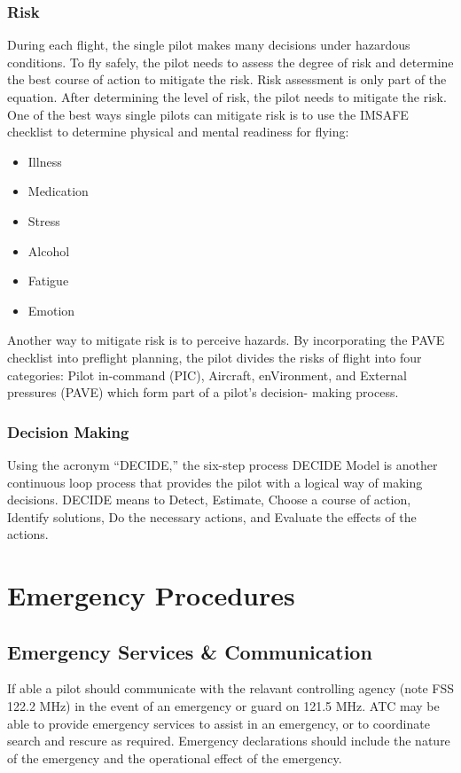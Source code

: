 \documentclass[12pt]{article}
\begin{document}
		\subsubsection{Risk}
			During each flight, the single pilot makes many decisions under hazardous conditions. To fly safely, the pilot needs to assess the degree of risk and determine the best course of action to mitigate the risk. Risk assessment is only part of the equation. After determining the level of risk, the pilot needs to mitigate the risk. One of the best ways single pilots can mitigate risk is to use the IMSAFE checklist to determine physical and mental readiness for flying:
				\begin{itemize}
					\item Illness
					\item Medication
					\item Stress
					\item Alcohol
					\item Fatigue
					\item Emotion
				\end{itemize}
			Another way to mitigate risk is to perceive hazards. By incorporating the PAVE checklist into preflight planning, the pilot divides the risks of flight into four categories: Pilot­ in-command (PIC), Aircraft, enVironment, and External pressures (PAVE) which form part of a pilot’s decision- making process.
		\subsubsection{Decision Making}
			Using the acronym ``DECIDE,'' the six-step process DECIDE Model is another continuous loop process that provides the pilot with a logical way of making decisions. DECIDE means to Detect, Estimate, Choose a course of action, Identify solutions, Do the necessary actions, and Evaluate the effects of the actions.
			
\newpage
\section{Emergency Procedures}
	\subsection{Emergency Services \& Communication}
		If able a pilot should communicate with the relavant controlling agency (note FSS 122.2 MHz) in the event of an emergency or guard on 121.5 MHz. ATC may be able to provide emergency services to assist in an emergency, or to coordinate search and rescure as required. Emergency declarations should include the nature of the emergency and the operational effect of the emergency.
\end{document}
